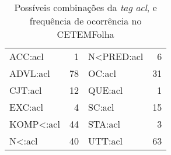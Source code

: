 \begin{table}[!ht]
    \centering
    \begin{tabular}{|l|r|l|r|}
        \hline
        ACC:acl     &   1   &   N<PRED:acl  &   6\\
        ADVL:acl    &   78  &   OC:acl  &   31\\
        CJT:acl     &   12  &   QUE:acl &   1\\
        EXC:acl     &   4   &  	SC:acl  &   15\\
        KOMP<:acl   &   44  &   STA:acl &   3\\
        N<:acl      &   40  &   UTT:acl &   63\\
        \hline
    \end{tabular}
    \caption{Possíveis combinações da \textit{tag} \textit{acl}, e frequência de ocorrência no CETEMFolha}
    \label{tab:bosque_acl}
\end{table}